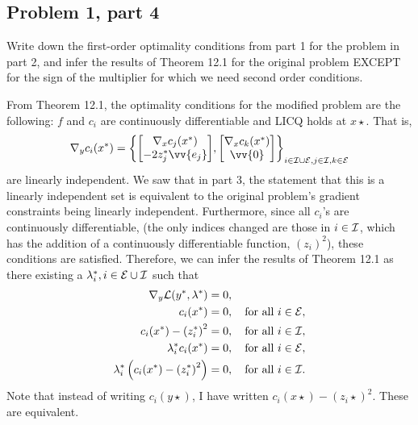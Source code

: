 \subsection{Problem 1, part 4}
Write down the first-order optimality conditions from part 1 for the problem in part 2, and infer the results of Theorem 12.1 for the original problem EXCEPT for the sign of the multiplier for which we need second order conditions. 
\partbreak
\begin{solution}

    From Theorem 12.1, the optimality conditions for the modified problem are the following: $f$ and $c_i$ are continuously differentiable and LICQ holds at $x\star$. That is, 
     \[\grad_y c_i(x\star) = \left\{ \mqty[\grad_xc_j(x\star)\\-2z_j\star \vv{e_j}],\mqty[\grad_x c_k(x\star)\\\vv{0}]\right\}_{i \in \scI \cup \scE, j \in \scI, k \in \scE}\]
     are linearly independent. We saw that in part 3, the statement that this is a linearly independent set is equivalent to the original problem's gradient constraints being linearly independent. Furthermore, since all $c_i$'s are continuously differentiable, (the only indices changed are those in $i \in \mathcal{I}$, which has the addition of a continuously differentiable function, $(z_i)^2$), these conditions are satisfied. Therefore, we can infer the results of Theorem 12.1 as there existing a $\mathrm{\lambda}_i^*, i \in \mathcal{E} \cup \mathcal{I}$ such that  
     \begin{align*}
         \nabla_y \mathcal{L} (y^*, \mathrm{\lambda}^*)& = 0, \\
         c_i(x^*)& = 0, \quad \text{for all } i \in \mathcal{E},\\
         c_i(x^*) - \left(z_i^*\right)^2& = 0, \quad \text{for all } i \in \mathcal{I},\\
         \mathrm{\lambda}_i^* c_i(x^*)& = 0, \quad \text{for all } i \in \mathcal{E},\\
         \mathrm{\lambda}_i^*\left(c_i(x^*) - \left( z_i^*\right)^2 \right)& = 0, \quad \text{for all } i \in \mathcal{I}. 
     \end{align*}
     Note that instead of writing $c_i(y\star)$, I have written $c_i(x\star) - \left( z_i\star\right)^2$. These are equivalent. 
\end{solution}

\newpage

